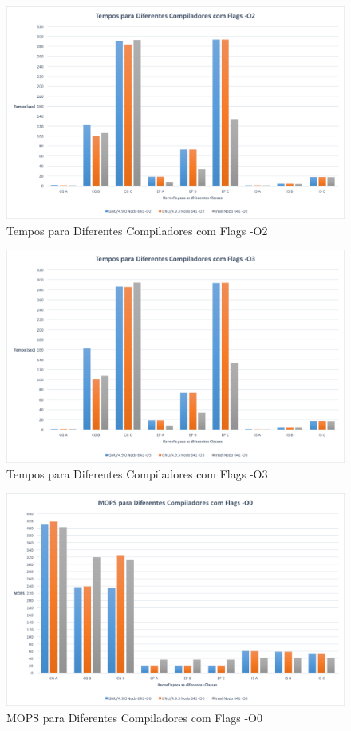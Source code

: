 \documentclass[conference,compsoc]{IEEEtran}
\begin{document}
\begin{figure}[h!]
\centering
\includegraphics[scale=0.325]{SER/tempos_dif_comp_O2_nodo_641.png}
\caption{Tempos para Diferentes Compiladores com Flags -O2}
\end{figure}

\begin{figure}[h!]
\centering
\includegraphics[scale=0.325]{SER/tempos_dif_comp_O3_nodo_641.png}
\caption{Tempos para Diferentes Compiladores com Flags -O3}
\end{figure}

\begin{figure}[h!]
\centering
\includegraphics[scale=0.325]{SER/mops_dif_comp_O0_nodo_641.png}
\caption{MOPS para Diferentes Compiladores com Flags -O0}
\end{figure}
\end{document}
